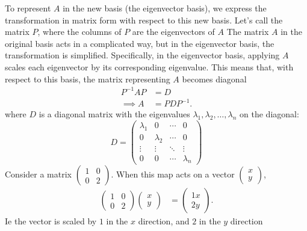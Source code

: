 \documentclass{report}
\begin{document}
\begin{itemize}
            To represent $A$ in the new basis (the eigenvector basis), we express the transformation in matrix form with respect to this new basis. Let’s call the matrix $P$, where the columns of $P$ are the eigenvectors of $A$
            \bigbreak \noindent 
            The matrix $A$ in the original basis acts in a complicated way, but in the eigenvector basis, the transformation is simplified. Specifically, in the eigenvector basis, applying $A$ scales each eigenvector by its corresponding eigenvalue. This means that, with respect to this basis, the matrix representing $A$ becomes diagonal
            \bigbreak \noindent 
            \begin{align*}
                P^{-1}AP &= D \\
                \implies  A &= PDP^{-1}
            .\end{align*}
            \bigbreak \noindent 
            where \( D \) is a diagonal matrix with the eigenvalues \( \lambda_1, \lambda_2, \dots, \lambda_n \) on the diagonal:
            \[
                D = \begin{pmatrix}
                    \lambda_1 & 0 & \cdots & 0 \\
                    0 & \lambda_2 & \cdots & 0 \\
                    \vdots & \vdots & \ddots & \vdots \\
                    0 & 0 & \cdots & \lambda_n
                \end{pmatrix}
            \]
            \bigbreak \noindent 
            Consider a matrix $\begin{pmatrix} 1 & 0 \\ 0 & 2 \end{pmatrix}$. When this map acts on a vector $\begin{pmatrix} x \\ y \end{pmatrix}$,
            \begin{align*}
                \begin{pmatrix} 1 & 0 \\ 0 & 2 \end{pmatrix} \begin{pmatrix} x \\ y\end{pmatrix} &= \begin{pmatrix} 1x \\ 2y\end{pmatrix}
            .\end{align*}
            Ie the vector is scaled by $1$ in the $x$ direction, and $2$ in the $y$ direction

\end{itemize}
\end{document}
